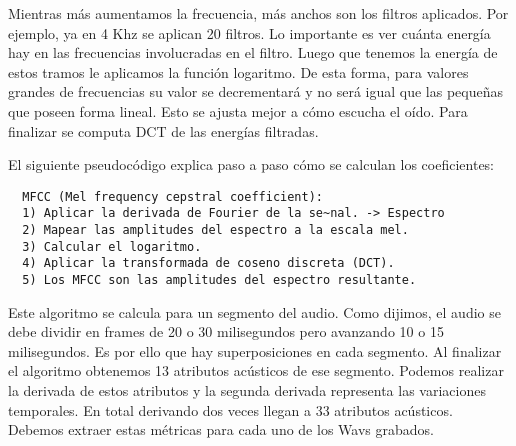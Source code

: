 
Mientras más aumentamos la frecuencia, más anchos son los filtros aplicados. Por ejemplo, ya en 4 Khz se aplican 20 filtros. Lo importante es ver cuánta energía hay en las frecuencias involucradas en el filtro. Luego que tenemos la energía de estos tramos le aplicamos la función logaritmo. De esta forma, para valores grandes de frecuencias su valor se decrementará y no será igual que las pequeñas que poseen forma lineal. Esto se ajusta mejor a cómo escucha el oído. Para finalizar se computa DCT de las energías filtradas. 

El siguiente pseudocódigo explica paso a paso cómo se calculan los coeficientes:
\begin{lstlisting}
  MFCC (Mel frequency cepstral coefficient):
  1) Aplicar la derivada de Fourier de la se~nal. -> Espectro
  2) Mapear las amplitudes del espectro a la escala mel.  
  3) Calcular el logaritmo.
  4) Aplicar la transformada de coseno discreta (DCT).
  5) Los MFCC son las amplitudes del espectro resultante.
\end{lstlisting}

Este algoritmo se calcula para un segmento del audio. Como dijimos, el audio se debe dividir en frames de 20 o 30 milisegundos pero avanzando 10 o 15 milisegundos. Es por ello que hay superposiciones en cada segmento. Al finalizar el algoritmo obtenemos 13 atributos acústicos de ese segmento. Podemos realizar la derivada de estos atributos y la segunda derivada representa las variaciones temporales. En total derivando dos veces llegan a 33 atributos acústicos. Debemos extraer estas métricas para cada uno de los Wavs grabados.

